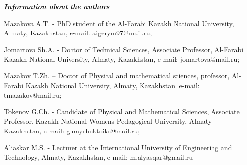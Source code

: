 \emph{{\bfseries Information about the authors}}

Mazakova A.T. - PhD student of the Al-Farabi Kazakh National University,
Almaty, Kazakhstan, e-mail: aigerym97@mail.ru;

Jomartova Sh.A. - Doctor of Technical Sciences, Associate Professor,
Al-Farabi Kazakh National University, Almaty, Kazakhstan, e-mail:
jomartova@mail.ru;

Mazakov T.Zh. -- Doctor of Physical and mathematical sciences,
professor, Al-Farabi Kazakh National University, Almaty, Kazakhstan,
e-mail: tmazakov@mail.ru;

Tokenov G.Ch. - Candidate of Physical and Mathematical Sciences,
Associate Professor, Kazakh National Women\textquotesingle s Pedagogical
University, Almaty, Kazakhstan, e-mail: gumyrbektoike@mail.ru;

Aliaskar M.S. - Lecturer at the International University of Engineering
and Technology, Almaty, Kazakhstan, e-mail: m.alyasqar@gmail.ru
